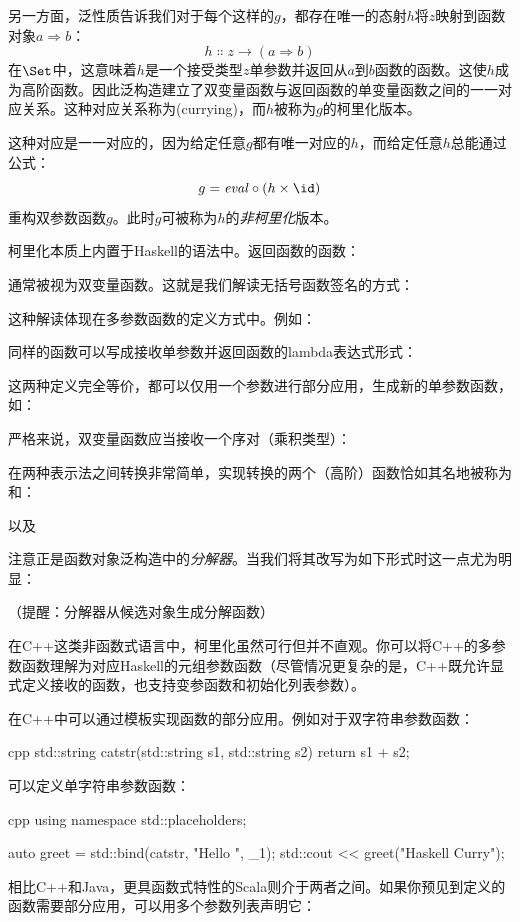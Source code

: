 另一方面，泛性质告诉我们对于每个这样的$g$，都存在唯一的态射$h$将$z$映射到函数对象$a \Rightarrow b$：
$$h \Colon z \to (a \Rightarrow b)$$
在$\Set$中，这意味着$h$是一个接受类型$z$单参数并返回从$a$到$b$函数的函数。这使$h$成为高阶函数。因此泛构造建立了双变量函数与返回函数的单变量函数之间的一一对应关系。这种对应关系称为(currying)，而$h$被称为$g$的柯里化版本。

这种对应是一一对应的，因为给定任意$g$都有唯一对应的$h$，而给定任意$h$总能通过公式：
$$g = \mathit{eval} \circ (h \times \id)$$
重构双参数函数$g$。此时$g$可被称为$h$的\emph{非柯里化}版本。

柯里化本质上内置于Haskell的语法中。返回函数的函数：

通常被视为双变量函数。这就是我们解读无括号函数签名的方式：

这种解读体现在多参数函数的定义方式中。例如：

同样的函数可以写成接收单参数并返回函数的lambda表达式形式：

这两种定义完全等价，都可以仅用一个参数进行部分应用，生成新的单参数函数，如：

严格来说，双变量函数应当接收一个序对（乘积类型）：

在两种表示法之间转换非常简单，实现转换的两个（高阶）函数恰如其名地被称为和：

以及

注意正是函数对象泛构造中的\emph{分解器}。当我们将其改写为如下形式时这一点尤为明显：

（提醒：分解器从候选对象生成分解函数）

在C++这类非函数式语言中，柯里化虽然可行但并不直观。你可以将C++的多参数函数理解为对应Haskell的元组参数函数（尽管情况更复杂的是，C++既允许显式定义接收的函数，也支持变参函数和初始化列表参数）。

在C++中可以通过模板实现函数的部分应用。例如对于双字符串参数函数：

\begin{snip}{cpp}
std::string catstr(std::string s1, std::string s2) {
    return s1 + s2;
}
\end{snip}
可以定义单字符串参数函数：

\begin{snip}{cpp}
using namespace std::placeholders;

auto greet = std::bind(catstr, "Hello ", _1);
std::cout << greet("Haskell Curry");
\end{snip}
相比C++和Java，更具函数式特性的Scala则介于两者之间。如果你预见到定义的函数需要部分应用，可以用多个参数列表声明它：

